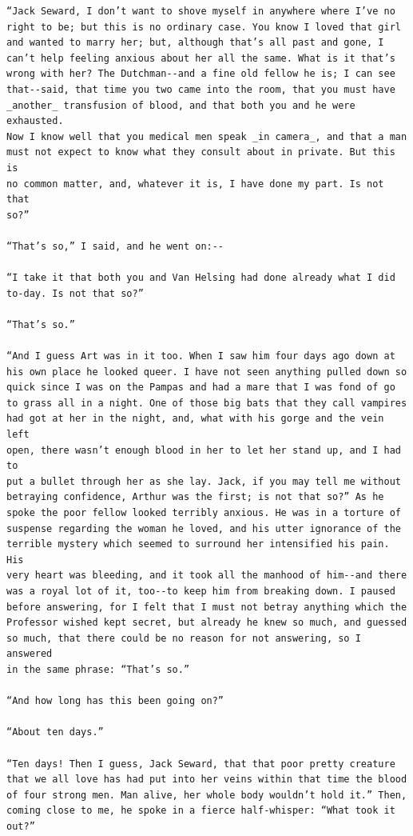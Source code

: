 \documentclass{article}
\begin{document}
\begin{verbatim}
“Jack Seward, I don’t want to shove myself in anywhere where I’ve no
right to be; but this is no ordinary case. You know I loved that girl
and wanted to marry her; but, although that’s all past and gone, I
can’t help feeling anxious about her all the same. What is it that’s
wrong with her? The Dutchman--and a fine old fellow he is; I can see
that--said, that time you two came into the room, that you must have
_another_ transfusion of blood, and that both you and he were exhausted.
Now I know well that you medical men speak _in camera_, and that a man
must not expect to know what they consult about in private. But this is
no common matter, and, whatever it is, I have done my part. Is not that
so?”

“That’s so,” I said, and he went on:--

“I take it that both you and Van Helsing had done already what I did
to-day. Is not that so?”

“That’s so.”

“And I guess Art was in it too. When I saw him four days ago down at
his own place he looked queer. I have not seen anything pulled down so
quick since I was on the Pampas and had a mare that I was fond of go
to grass all in a night. One of those big bats that they call vampires
had got at her in the night, and, what with his gorge and the vein left
open, there wasn’t enough blood in her to let her stand up, and I had to
put a bullet through her as she lay. Jack, if you may tell me without
betraying confidence, Arthur was the first; is not that so?” As he
spoke the poor fellow looked terribly anxious. He was in a torture of
suspense regarding the woman he loved, and his utter ignorance of the
terrible mystery which seemed to surround her intensified his pain. His
very heart was bleeding, and it took all the manhood of him--and there
was a royal lot of it, too--to keep him from breaking down. I paused
before answering, for I felt that I must not betray anything which the
Professor wished kept secret, but already he knew so much, and guessed
so much, that there could be no reason for not answering, so I answered
in the same phrase: “That’s so.”

“And how long has this been going on?”

“About ten days.”

“Ten days! Then I guess, Jack Seward, that that poor pretty creature
that we all love has had put into her veins within that time the blood
of four strong men. Man alive, her whole body wouldn’t hold it.” Then,
coming close to me, he spoke in a fierce half-whisper: “What took it
out?”


\end{verbatim}
\end{document}
